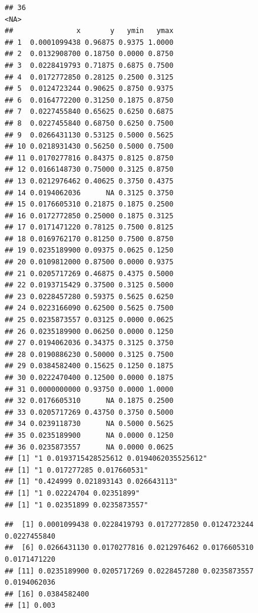 \documentclass[]{article}
\begin{document}
\begin{verbatim}
## 36                                                                                                                                                                                                                                                                                                                                                                                                                           <NA>
##               x       y   ymin   ymax
## 1  0.0001099438 0.96875 0.9375 1.0000
## 2  0.0132908700 0.18750 0.0000 0.8750
## 3  0.0228419793 0.71875 0.6875 0.7500
## 4  0.0172772850 0.28125 0.2500 0.3125
## 5  0.0124723244 0.90625 0.8750 0.9375
## 6  0.0164772200 0.31250 0.1875 0.8750
## 7  0.0227455840 0.65625 0.6250 0.6875
## 8  0.0227455840 0.68750 0.6250 0.7500
## 9  0.0266431130 0.53125 0.5000 0.5625
## 10 0.0218931430 0.56250 0.5000 0.7500
## 11 0.0170277816 0.84375 0.8125 0.8750
## 12 0.0166148730 0.75000 0.3125 0.8750
## 13 0.0212976462 0.40625 0.3750 0.4375
## 14 0.0194062036      NA 0.3125 0.3750
## 15 0.0176605310 0.21875 0.1875 0.2500
## 16 0.0172772850 0.25000 0.1875 0.3125
## 17 0.0171471220 0.78125 0.7500 0.8125
## 18 0.0169762170 0.81250 0.7500 0.8750
## 19 0.0235189900 0.09375 0.0625 0.1250
## 20 0.0109812000 0.87500 0.0000 0.9375
## 21 0.0205717269 0.46875 0.4375 0.5000
## 22 0.0193715429 0.37500 0.3125 0.5000
## 23 0.0228457280 0.59375 0.5625 0.6250
## 24 0.0223166090 0.62500 0.5625 0.7500
## 25 0.0235873557 0.03125 0.0000 0.0625
## 26 0.0235189900 0.06250 0.0000 0.1250
## 27 0.0194062036 0.34375 0.3125 0.3750
## 28 0.0190886230 0.50000 0.3125 0.7500
## 29 0.0384582400 0.15625 0.1250 0.1875
## 30 0.0222470400 0.12500 0.0000 0.1875
## 31 0.0000000000 0.93750 0.0000 1.0000
## 32 0.0176605310      NA 0.1875 0.2500
## 33 0.0205717269 0.43750 0.3750 0.5000
## 34 0.0239118730      NA 0.5000 0.5625
## 35 0.0235189900      NA 0.0000 0.1250
## 36 0.0235873557      NA 0.0000 0.0625
## [1] "1 0.0193715428525612 0.0194062035525612"
## [1] "1 0.017277285 0.017660531"
## [1] "0.424999 0.021893143 0.026643113"
## [1] "1 0.02224704 0.02351899"
## [1] "1 0.02351899 0.0235873557"
\end{verbatim}

\begin{verbatim}
##  [1] 0.0001099438 0.0228419793 0.0172772850 0.0124723244 0.0227455840
##  [6] 0.0266431130 0.0170277816 0.0212976462 0.0176605310 0.0171471220
## [11] 0.0235189900 0.0205717269 0.0228457280 0.0235873557 0.0194062036
## [16] 0.0384582400
## [1] 0.003
\end{verbatim}
\end{document}
